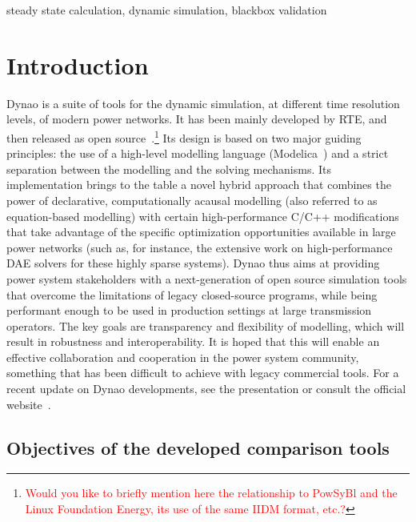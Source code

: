 \documentclass[conference]{IEEEtran}
\newcommand{\Dynawo}{Dyna\textomega o\xspace} %
\begin{document}
\begin{IEEEkeywords}
  steady state calculation, dynamic simulation, blackbox validation
\end{IEEEkeywords}




\section{Introduction}

\Dynawo\cite{Guironnet18} is a suite of tools for the dynamic simulation, at
different time resolution levels, of modern power networks.  It has been mainly
developed by RTE, and then released as open
source~\cite{Dynawo}.\footnote{\textcolor{red}{Would you like to briefly mention
  here the relationship to PowSyBl and the Linux Foundation Energy, its use of
  the same IIDM format, etc.?}}  Its design is based on two major guiding
principles: the use of a high-level modelling language
(Modelica~\cite{Modelica}) and a strict separation between the modelling and the
solving mechanisms.  Its implementation brings to the table a novel hybrid
approach that combines the power of declarative, computationally acausal
modelling (also referred to as equation-based modelling) with certain
high-performance C/C++ modifications that take advantage of the specific
optimization opportunities available in large power networks (such as, for
instance, the extensive work on high-performance DAE solvers for these highly
sparse systems).  \Dynawo thus aims at providing power system stakeholders with
a next-generation of open source simulation tools that overcome the limitations
of legacy closed-source programs, while being performant enough to be used in
production settings at large transmission operators. The key goals are
transparency and flexibility of modelling, which will result in robustness and
interoperability. It is hoped that this will enable an effective collaboration
and cooperation in the power system community, something that has been difficult
to achieve with legacy commercial tools.  For a recent update on \Dynawo
developments, see the presentation \cite{Guironnet21} or consult the official
website~\cite{Dynawo}.



\subsection{Objectives of the developed comparison tools}
\end{document}
